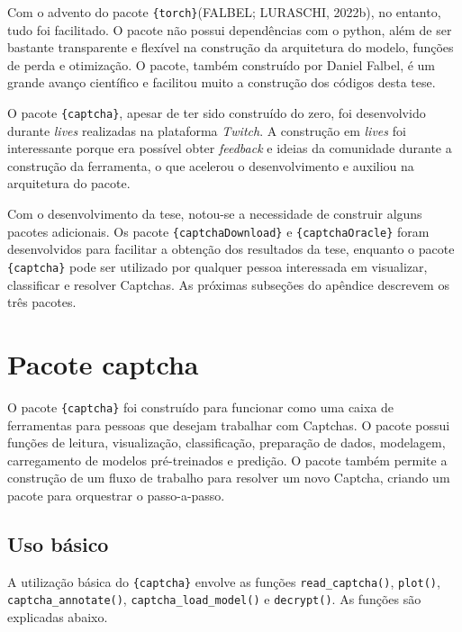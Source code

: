 \documentclass[12pt,twoside,brazilian]{book}
\begin{document}
Com o advento do pacote \texttt{\{torch\}}(FALBEL; LURASCHI, 2022b), no
entanto, tudo foi facilitado. O pacote não possui dependências com o
python, além de ser bastante transparente e flexível na construção da
arquitetura do modelo, funções de perda e otimização. O pacote, também
construído por Daniel Falbel, é um grande avanço científico e facilitou
muito a construção dos códigos desta tese.

O pacote \texttt{\{captcha\}}, apesar de ter sido construído do zero,
foi desenvolvido durante \emph{lives} realizadas na plataforma
\emph{Twitch}. A construção em \emph{lives} foi interessante porque era
possível obter \emph{feedback} e ideias da comunidade durante a
construção da ferramenta, o que acelerou o desenvolvimento e auxiliou na
arquitetura do pacote.

Com o desenvolvimento da tese, notou-se a necessidade de construir
alguns pacotes adicionais. Os pacote \texttt{\{captchaDownload\}} e
\texttt{\{captchaOracle\}} foram desenvolvidos para facilitar a obtenção
dos resultados da tese, enquanto o pacote \texttt{\{captcha\}} pode ser
utilizado por qualquer pessoa interessada em visualizar, classificar e
resolver Captchas. As próximas subseções do apêndice descrevem os três
pacotes.

\hypertarget{sec-pacote-captcha}{%
\section{Pacote captcha}\label{sec-pacote-captcha}}

O pacote \texttt{\{captcha\}} foi construído para funcionar como uma
caixa de ferramentas para pessoas que desejam trabalhar com Captchas. O
pacote possui funções de leitura, visualização, classificação,
preparação de dados, modelagem, carregamento de modelos pré-treinados e
predição. O pacote também permite a construção de um fluxo de trabalho
para resolver um novo Captcha, criando um pacote para orquestrar o
passo-a-passo.

\hypertarget{uso-buxe1sico}{%
\subsection{Uso básico}\label{uso-buxe1sico}}

A utilização básica do \texttt{\{captcha\}} envolve as funções
\texttt{read\_captcha()}, \texttt{plot()}, \texttt{captcha\_annotate()},
\texttt{captcha\_load\_model()} e \texttt{decrypt()}. As funções são
explicadas abaixo.
\end{document}
